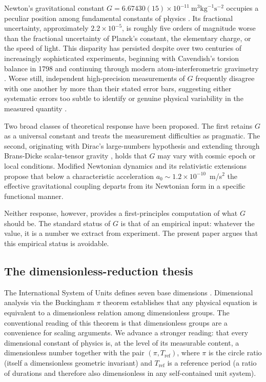 \documentclass[11pt,twocolumn,a4paper]{article}
\theoremstyle{definition}
\theoremstyle{remark}
\newcommand{\Gnewton}{G}
\begin{document}
Newton's gravitational constant $\Gnewton = 6.67430(15) \times 10^{-11}~\text{m}^3\text{kg}^{-1}\text{s}^{-2}$ occupies a peculiar position among fundamental constants of physics \citep{codata2018,speake2014}. Its fractional uncertainty, approximately $2.2 \times 10^{-5}$, is roughly five orders of magnitude worse than the fractional uncertainty of Planck's constant, the elementary charge, or the speed of light. This disparity has persisted despite over two centuries of increasingly sophisticated experiments, beginning with Cavendish's torsion balance in 1798 \citep{cavendish1798} and continuing through modern atom-interferometric gravimetry \citep{rosi2014,fixler2007}. Worse still, independent high-precision measurements of $\Gnewton$ frequently disagree with one another by more than their stated error bars, suggesting either systematic errors too subtle to identify or genuine physical variability in the measured quantity \citep{quinn2013,schlamminger2014}.

Two broad classes of theoretical response have been proposed. The first retains $\Gnewton$ as a universal constant and treats the measurement difficulties as pragmatic. The second, originating with Dirac's large-numbers hypothesis \citep{dirac1937} and extending through Brans-Dicke scalar-tensor gravity \citep{brans1961}, holds that $\Gnewton$ may vary with cosmic epoch or local conditions. Modified Newtonian dynamics \citep{milgrom1983} and its relativistic extensions \citep{bekenstein2004} propose that below a characteristic acceleration $a_0 \sim 1.2 \times 10^{-10}$~m/s$^2$ the effective gravitational coupling departs from its Newtonian form in a specific functional manner.

Neither response, however, provides a first-principles computation of what $\Gnewton$ should be. The standard status of $\Gnewton$ is that of an empirical input: whatever the value, it is a number we extract from experiment. The present paper argues that this empirical status is avoidable.

\subsection{The dimensionless-reduction thesis}

The International System of Units defines seven base dimensions \citep{codata2018}. Dimensional analysis via the Buckingham $\pi$ theorem \citep{buckingham1914} establishes that any physical equation is equivalent to a dimensionless relation among dimensionless groups. The conventional reading of this theorem is that dimensionless groups are a convenience for scaling arguments. We advance a stronger reading: that every dimensional constant of physics is, at the level of its measurable content, a dimensionless number together with the pair $(\pi, T_\text{ref})$, where $\pi$ is the circle ratio (itself a dimensionless geometric invariant) and $T_\text{ref}$ is a reference period (a ratio of durations and therefore also dimensionless in any self-contained unit system).
\end{document}
